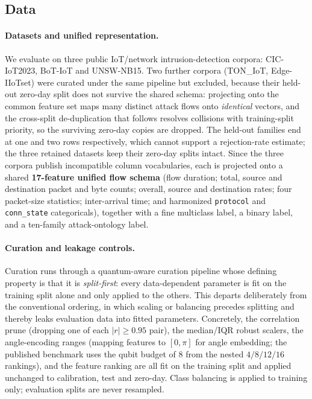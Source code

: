 
\subsection{Data}
\label{sec:methods-data}

\paragraph{Datasets and unified representation.}
We evaluate on three public IoT/network intrusion-detection corpora: CIC-IoT2023, BoT-IoT and UNSW-NB15.
Two further corpora (TON\_IoT, Edge-IIoTset) were curated under the same pipeline but excluded, because
their held-out zero-day split does not survive the shared schema: projecting onto the common feature set
maps many distinct attack flows onto \emph{identical} vectors, and the cross-split de-duplication that
follows resolves collisions with training-split priority, so the surviving zero-day copies are dropped. The
held-out families end at one and two rows respectively, which cannot support a rejection-rate estimate; the
three retained datasets keep their zero-day splits intact. Since the three corpora publish incompatible
column vocabularies,
each is projected onto a shared \textbf{17-feature unified flow schema} (flow duration; total, source and
destination packet and byte counts; overall, source and destination rates; four packet-size statistics;
inter-arrival time; and harmonized \texttt{protocol} and \texttt{conn\_state} categoricals), together with a
fine multiclass label, a binary label, and a ten-family attack-ontology label.

\paragraph{Curation and leakage controls.}
Curation runs through a quantum-aware curation pipeline whose defining property is that it is
\emph{split-first}: every data-dependent parameter is fit on the training split alone and only applied to
the others. This departs deliberately from the conventional ordering, in which scaling or balancing precedes
splitting and thereby leaks evaluation data into fitted parameters. Concretely, the correlation prune
(dropping one of each $|r| \geq 0.95$ pair), the median/IQR robust scalers, the angle-encoding ranges
(mapping features to $[0, \pi]$ for angle embedding; the published benchmark uses the qubit budget of $8$
from the nested $4/8/12/16$ rankings), and the feature ranking are all fit on the training split and applied
unchanged to calibration, test and zero-day. Class balancing is applied to
training only; evaluation splits are never resampled.

